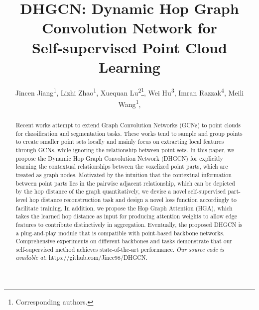 \documentclass[letterpaper]{article} %
\title{DHGCN: Dynamic Hop Graph Convolution Network for \\Self-supervised Point Cloud Learning}
\author{
    Jincen Jiang\textsuperscript{\rm 1}\equalcontrib,
    Lizhi Zhao\textsuperscript{\rm 1}\equalcontrib,
    Xuequan Lu\textsuperscript{\rm 2}\thanks{Corresponding authors.},
    Wei Hu\textsuperscript{\rm 3},
    Imran Razzak\textsuperscript{\rm 4},
    Meili Wang\textsuperscript{\rm 1}\footnotemark[2],
}
\begin{document}
\maketitle

\begin{abstract}
Recent works attempt to extend Graph Convolution Networks (GCNs) to point clouds for classification and segmentation tasks. These works tend to sample and group points to create smaller point sets locally and mainly focus on extracting local features through GCNs, while ignoring the relationship between point sets. In this paper, we propose the Dynamic Hop Graph Convolution Network (DHGCN) for explicitly learning the contextual relationships between the voxelized point parts, which are treated as graph nodes. Motivated by the intuition that the contextual information between point parts lies in the pairwise adjacent relationship, which can be depicted by the hop distance of the graph quantitatively, we devise a novel self-supervised part-level hop distance reconstruction task and design a novel loss function accordingly to facilitate training. In addition, we propose the Hop Graph Attention (HGA), which takes the learned hop distance as input for producing attention weights to allow edge features to contribute distinctively in aggregation. Eventually, the proposed DHGCN is a plug-and-play module that is compatible with point-based backbone networks. Comprehensive experiments on different backbones and tasks demonstrate that our self-supervised method achieves state-of-the-art performance. \textit{Our source code is available at}: https://github.com/Jinec98/DHGCN.
\end{abstract}

\end{document}
